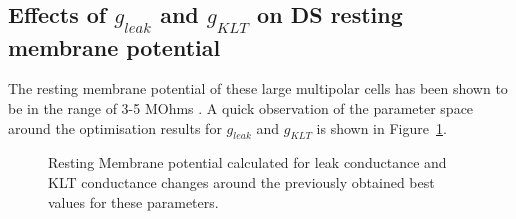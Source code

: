 


\subsection{Effects of $g_{leak}$ and $g_{KLT}$ on DS resting membrane potential}\label{sec:DS:effects-g_leak-g_lkt}



The resting membrane potential of these large multipolar cells has been shown to
be in the range of 3-5 MOhms . A quick
observation of the parameter space around the optimisation results for
$g_{leak}$ and $g_{KLT}$ is shown in Figure~\ref{fig:leakVltk}.

\begin{figure}[htb]
  \centering 
{}
\caption[DS RMP dynamics]{Resting Membrane potential calculated for leak
  conductance and KLT conductance changes around the previously obtained best
  values for these parameters.}    \label{fig:leakVltk}
\end{figure}



